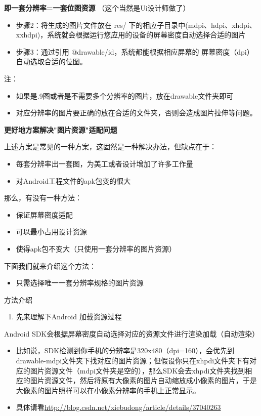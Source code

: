 \documentclass[9pt, b5paper]{article}
\begin{document}
\begin{enumerate}
\textbf{即一套分辨率=一套位图资源} （这个当然是Ui设计师做了）
\begin{itemize}
\item 步骤2：将生成的图片文件放在 res/ 下的相应子目录中(mdpi、hdpi、xhdpi、xxhdpi)，系统就会根据运行您应用的设备的屏幕密度自动选择合适的图片
\item 步骤3：通过引用 @drawable/id，系统都能根据相应屏幕的 屏幕密度（dpi）自动选取合适的位图。
\end{itemize}

注：
\begin{itemize}
\item 如果是.9图或者是不需要多个分辨率的图片，放在drawable文件夹即可
\item 对应分辨率的图片要正确的放在合适的文件夹，否则会造成图片拉伸等问题。
\end{itemize}

\textbf{更好地方案解决"图片资源"适配问题}

上述方案是常见的一种方案，这固然是一种解决办法，但缺点在于：
\begin{itemize}
\item 每套分辨率出一套图，为美工或者设计增加了许多工作量
\item 对Android工程文件的apk包变的很大
\end{itemize}

那么，有没有一种方法：
\begin{itemize}
\item 保证屏幕密度适配
\item 可以最小占用设计资源
\item 使得apk包不变大（只使用一套分辨率的图片资源）
\end{itemize}

下面我们就来介绍这个方法：

\begin{itemize}
\item 只需选择唯一一套分辨率规格的图片资源
\end{itemize}

方法介绍

\begin{enumerate}
\item 先来理解下Android 加载资源过程
\end{enumerate}

Android SDK会根据屏幕密度自动选择对应的资源文件进行渲染加载（自动渲染）
\begin{itemize}
\item 比如说，SDK检测到你手机的分辨率是320x480（dpi=160），会优先到drawable-mdpi文件夹下找对应的图片资源；但假设你只在xhpdi文件夹下有对应的图片资源文件（mdpi文件夹是空的），那么SDK会去xhpdi文件夹找到相应的图片资源文件，然后将原有大像素的图片自动缩放成小像素的图片，于是大像素的图片照样可以在小像素分辨率的手机上正常显示。
\item 具体请看\url{http://blog.csdn.net/xiebudong/article/details/37040263}
\end{itemize}


\end{enumerate}
\end{document}

